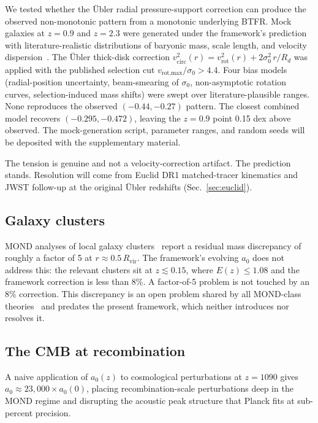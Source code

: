 \documentclass[
    aps,
    prd,
    reprint,
    superscriptaddress,
    nofootinbib,
    floatfix
]{revtex4-2}
\begin{document}
We tested whether the \"Ubler radial pressure-support correction can
produce the observed non-monotonic pattern from a monotonic
underlying BTFR. Mock galaxies at $z = 0.9$ and $z = 2.3$ were
generated under the framework's prediction with literature-realistic
distributions of baryonic mass, scale length, and velocity
dispersion~\cite{Wisnioski2015}. The \"Ubler thick-disk correction
$v_\text{circ}^2(r) = v_\text{rot}^2(r) + 2\sigma_0^2\,r/R_d$ was
applied with the published selection cut
$v_\text{rot,max}/\sigma_0 > 4.4$. Four bias models (radial-position
uncertainty, beam-smearing of $\sigma_0$, non-asymptotic rotation
curves, selection-induced mass shifts) were swept over
literature-plausible ranges. None reproduces the observed
$(-0.44, -0.27)$ pattern. The closest combined model recovers
$(-0.295, -0.472)$, leaving the $z = 0.9$ point 0.15 dex above
observed. The mock-generation script, parameter ranges, and random
seeds will be deposited with the supplementary material.

The tension is genuine and not a velocity-correction artifact. The
prediction stands. Resolution will come from Euclid DR1
matched-tracer kinematics and JWST follow-up at the original \"Ubler
redshifts (Sec.~\ref{sec:euclid}).

\subsection{Galaxy clusters}
\label{sec:clusters}

MOND analyses of local galaxy clusters~\cite{PointecouteauSilk2005}
report a residual mass discrepancy of roughly a factor of 5 at
$r \approx 0.5\,R_\text{vir}$. The framework's evolving $a_0$ does
not address this: the relevant clusters sit at $z \lesssim 0.15$,
where $E(z) \leq 1.08$ and the framework correction is less than
8\%. A factor-of-5 problem is not touched by an 8\% correction. This
discrepancy is an open problem shared by all MOND-class
theories~\cite{Sanders2003, Angus2008, Famaey2012} and predates the
present framework, which neither introduces nor resolves it.

\subsection{The CMB at recombination}
\label{sec:cmb}

A naive application of $a_0(z)$ to cosmological perturbations at
$z = 1090$ gives $a_0 \approx 23{,}000 \times a_0(0)$, placing
recombination-scale perturbations deep in the MOND regime and
disrupting the acoustic peak structure that Planck fits at
sub-percent precision.
\end{document}
